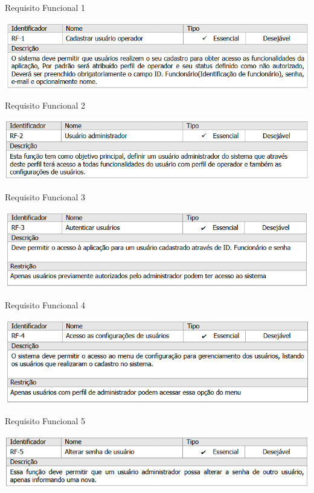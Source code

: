 \begin{table}[H]\label{tab:rf01}
    \caption{Requisito Funcional 1}
    \centering
    \includegraphics[scale=0.82]{imagens/rf01.png}
\end{table}
\begin{table}[H]\label{tab:rf02}
    \caption{Requisito Funcional 2}
    \centering
    \includegraphics[scale=0.82]{imagens/rf02.png}
\end{table}
\begin{table}[H]\label{tab:rf03}
    \caption{Requisito Funcional 3}
    \centering
    \includegraphics[scale=0.9]{imagens/rf03.png}
\end{table}
\begin{table}[H]\label{tab:rf04}
    \caption{Requisito Funcional 4}
    \centering
    \includegraphics[scale=0.9]{imagens/rf04.png}
\end{table}
\begin{table}[H]\label{tab:rf05}
    \caption{Requisito Funcional 5}
    \centering
    \includegraphics[scale=0.9]{imagens/rf05.png}
\end{table}
